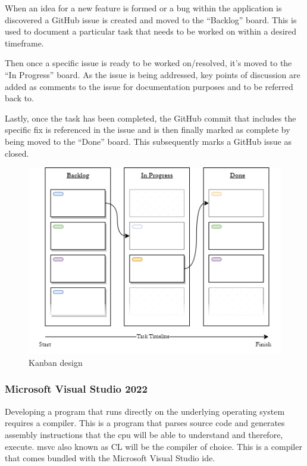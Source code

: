 \documentclass[11pt]{article}
\begin{document}
When an idea for a new feature is formed or a bug within the application is
discovered a GitHub issue is created and moved to the ``Backlog'' board. This is
used to document a particular task that needs to be worked on within a desired
timeframe.

Then once a specific issue is ready to be worked on/resolved, it's moved to the
``In Progress'' board. As the issue is being addressed, key points of discussion
are added as comments to the issue for documentation purposes and to be referred
back to.

Lastly, once the task has been completed, the GitHub commit that includes the
specific fix is referenced in the issue and is then finally marked as complete
by being moved to the ``Done'' board. This subsequently marks a GitHub issue as
closed.

\begin{figure}[H]
  \centering
  \includegraphics[width=\textwidth]{images/kanban_design.png}
  \caption{Kanban design}
  \label{fig:kanban_design}
\end{figure}

\subsubsection{Microsoft Visual Studio 2022}
Developing a program that runs directly on the underlying operating system
requires a compiler. This is a program that parses source code and generates
assembly instructions that the \gls*{cpu} will be able to understand and
therefore, execute. \gls*{msvc} also known as CL will be the compiler of choice.
This is a compiler that comes bundled with the Microsoft Visual Studio
\gls*{ide}.
\end{document}
